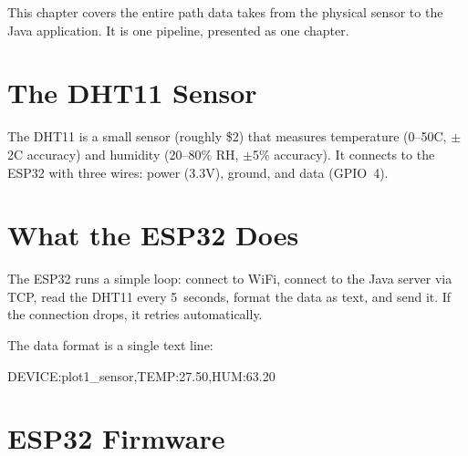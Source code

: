 \documentclass[12pt, a4paper]{report}
\begin{document}
This chapter covers the entire path data takes from the physical sensor to the Java application. It is one pipeline, presented as one chapter.

\section{The DHT11 Sensor}

The DHT11 is a small sensor (roughly \$2) that measures temperature (0--50\textdegree C, $\pm$2\textdegree C accuracy) and humidity (20--80\% RH, $\pm$5\% accuracy). It connects to the ESP32 with three wires: power (3.3V), ground, and data (GPIO~4).

\section{What the ESP32 Does}

The ESP32 runs a simple loop: connect to WiFi, connect to the Java server via TCP, read the DHT11 every 5~seconds, format the data as text, and send it. If the connection drops, it retries automatically.

The data format is a single text line:

\begin{tcolorbox}[colback=codebg, colframe=gray, fontupper=\ttfamily\color{codeyellow}]
DEVICE:plot1\_sensor,TEMP:27.50,HUM:63.20
\end{tcolorbox}

\section{ESP32 Firmware}
\end{document}
